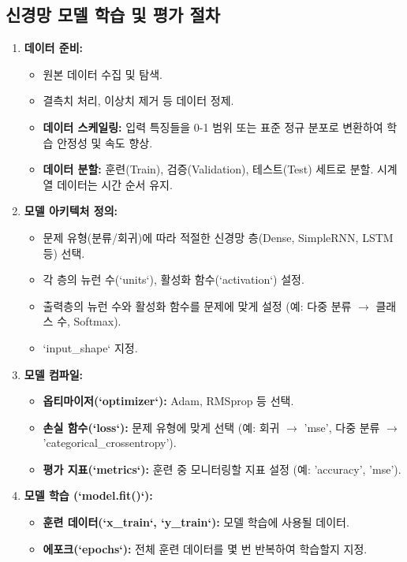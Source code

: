 \documentclass[11pt,a4paper]{article}
\begin{document}
\subsection{신경망 모델 학습 및 평가 절차}
\begin{enumerate}
    \item \textbf{데이터 준비:}
    \begin{itemize}
        \item 원본 데이터 수집 및 탐색.
        \item 결측치 처리, 이상치 제거 등 데이터 정제.
        \item \textbf{데이터 스케일링:} 입력 특징들을 0-1 범위 또는 표준 정규 분포로 변환하여 학습 안정성 및 속도 향상.
        \item \textbf{데이터 분할:} 훈련(Train), 검증(Validation), 테스트(Test) 세트로 분할. 시계열 데이터는 시간 순서 유지.
    \end{itemize}
    \item \textbf{모델 아키텍처 정의:}
    \begin{itemize}
        \item 문제 유형(분류/회귀)에 따라 적절한 신경망 층(Dense, SimpleRNN, LSTM 등) 선택.
        \item 각 층의 뉴런 수(`units`), 활성화 함수(`activation`) 설정.
        \item 출력층의 뉴런 수와 활성화 함수를 문제에 맞게 설정 (예: 다중 분류 $\rightarrow$ 클래스 수, Softmax).
        \item `input_shape` 지정.
    \end{itemize}
    \item \textbf{모델 컴파일:}
    \begin{itemize}
        \item \textbf{옵티마이저(`optimizer`):} Adam, RMSprop 등 선택.
        \item \textbf{손실 함수(`loss`):} 문제 유형에 맞게 선택 (예: 회귀 $\rightarrow$ 'mse', 다중 분류 $\rightarrow$ 'categorical_crossentropy').
        \item \textbf{평가 지표(`metrics`):} 훈련 중 모니터링할 지표 설정 (예: 'accuracy', 'mse').
    \end{itemize}
    \item \textbf{모델 학습 (`model.fit()`):}
    \begin{itemize}
        \item \textbf{훈련 데이터(`x_train`, `y_train`):} 모델 학습에 사용될 데이터.
        \item \textbf{에포크(`epochs`):} 전체 훈련 데이터를 몇 번 반복하여 학습할지 지정.

\end{itemize}
\end{enumerate}
\end{document}
